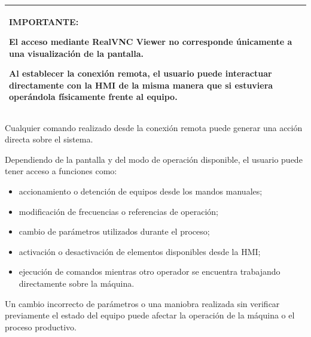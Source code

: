 \documentclass[11pt,a4paper]{article}
\begin{document}
\begin{center}

\renewcommand{\arraystretch}{1.18}

\begin{tabularx}{0.95\textwidth}{
|>{\raggedright\arraybackslash}X|
}

\hline

\cellcolor{AlertaClaro}

\textbf{\color{AlertaRojo}IMPORTANTE:}

El acceso mediante RealVNC Viewer no corresponde únicamente a una
visualización de la pantalla.

Al establecer la conexión remota, el usuario puede interactuar
directamente con la HMI de la misma manera que si estuviera operándola
físicamente frente al equipo.

\\

\hline

\end{tabularx}

\end{center}

Cualquier comando realizado desde la conexión remota puede generar una
acción directa sobre el sistema.

Dependiendo de la pantalla y del modo de operación disponible, el usuario
puede tener acceso a funciones como:

\begin{itemize}

    \item accionamiento o detención de equipos desde los mandos manuales;

    \item modificación de frecuencias o referencias de operación;

    \item cambio de parámetros utilizados durante el proceso;

    \item activación o desactivación de elementos disponibles desde la HMI;

    \item ejecución de comandos mientras otro operador se encuentra
    trabajando directamente sobre la máquina.

\end{itemize}

Un cambio incorrecto de parámetros o una maniobra realizada sin verificar
previamente el estado del equipo puede afectar la operación de la máquina
o el proceso productivo.
\end{document}
